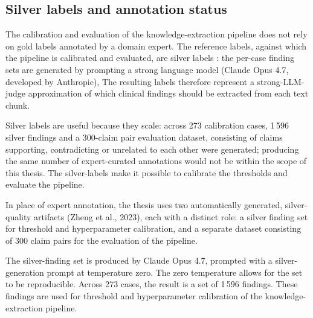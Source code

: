\subsection{Silver labels and annotation status}

The calibration and evaluation of the knowledge-extraction pipeline does not rely on gold labels annotated by a domain expert. The reference labels, against which the pipeline is calibrated and evaluated, are silver labels : the per-case finding sets are generated by prompting a strong language model (Claude Opus 4.7, developed by Anthropic),  The resulting labels therefore represent a strong-LLM-judge approximation of which clinical findings should be extracted from each text chunk. 



Silver labels are useful because they scale:  across 273 calibration cases, 1\,596 silver findings and a 300-claim pair evaluation dataset, consisting of claims supporting, contradicting or unrelated to each other were generated; producing the same number of expert-curated annotations would not be within the scope of this thesis. The silver-labels make it possible to calibrate the thresholds and evaluate the pipeline. 

In place of expert annotation, the thesis uses two automatically generated, silver-quality artifacts (Zheng et al., 2023), each with a distinct role: a silver finding set for threshold and hyperparameter calibration, and a separate dataset consisting of 300 claim pairs for the evaluation of the pipeline. 

The silver-finding set is produced by Claude Opus 4.7, prompted with a silver-generation prompt at temperature zero. The zero temperature allows for the set to be reproducible. Across 273 cases, the result is a set of 1\,596 findings. These findings are used for threshold and hyperparameter calibration of the knowledge-extraction pipeline.

